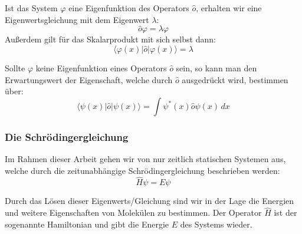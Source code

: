 Ist das System $\varphi$ eine Eigenfunktion des Operators $\hat{o}$,
erhalten wir eine Eigenwertsgleichung mit dem Eigenwert $\lambda$:
\begin{equation}
    \hat{o} \varphi = \lambda \varphi
\end{equation}
Außerdem gilt für das Skalarprodukt mit sich selbst dann:
\begin{equation}
    \langle \varphi(x) \vert \hat{o} \vert \varphi(x) \rangle = \lambda
\end{equation}

Sollte $\varphi$ keine Eigenfunktion eines Operators $\hat{o}$ sein,
so kann man den Erwartungswert der Eigenschaft, welche durch $\hat{o}$ ausgedrückt wird, bestimmen über:
\begin{equation}
\langle \psi(x) \vert \hat{o} \vert \psi(x) \rangle
  = \int \psi^*(x) \hat{o} \psi(x) \,dx
\end{equation}

\cite{tc1_ops}
\cite[S. 21]{atkins_friedman_2011}
\cite[S. 155-156]{levine_2019}

\subsubsection{Die Schrödingergleichung}
Im Rahmen dieser Arbeit gehen wir von nur zeitlich statischen Systemen aus,
welche durch die zeitunabhängige Schrödingergleichung beschrieben werden:
\begin{equation}\label{schroedinger}
  \hat{H}\psi = E\psi
\end{equation}

Durch das Lösen dieser Eigenwerts\-/Gleichung sind wir in der Lage
die Energien und weitere Eigenschaften von Molekülen zu bestimmen.
Der Operator $\hat{H}$ ist der sogenannte Hamiltonian und
gibt die Energie $E$ des Systems wieder.

\cite[S. 24-25]{atkins_friedman_2011}